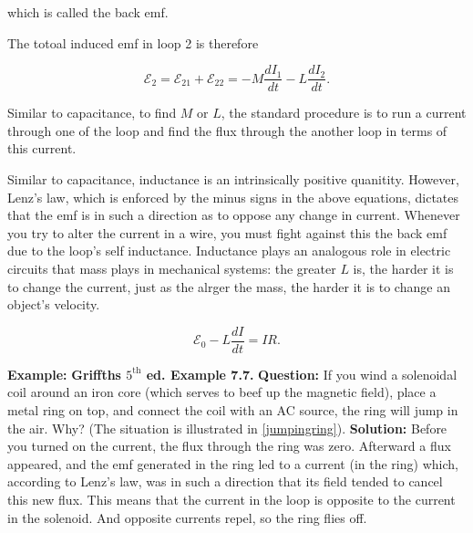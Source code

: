 \documentclass[english,a4paper,12pt]{report}
\begin{document}
which is called the back emf.

The totoal induced emf in loop 2 is therefore

\begin{equation}
    \mathcal{E}_{2}   = \mathcal{E} _{21} + \mathcal{E}_{22} =  -M\frac{dI_1 }{dt}  - L \frac{dI_2 }{dt}.
\end{equation}





Similar to capacitance, to find \(M \text { or } L\), the standard procedure is to run a current through one of the loop and find the flux through the another loop in terms of this current.  

Similar to capacitance, inductance is an intrinsically positive quanitity. However, Lenz's law, which is enforced by the minus signs in the above equations, dictates that the emf is in such a direction as to oppose any change in current. Whenever you try to alter the current in a wire, you must fight against this the back emf due to the loop's self inductance. Inductance plays an analogous role in electric circuits that mass plays in mechanical systems: the greater \(L\) is, the harder it is to change the current, just as the alrger the mass, the harder it is to change an object's velocity.

\begin{equation}
    \mathcal{E}_{0} - L\frac{dI}{dt} = IR.  
\end{equation}

\begin{example_template}
    \textbf{Example:} \textbf{Griffths \(5^\text{th}\) ed. Example 7.7.} \newline \newline
    \textbf{Question:} If you wind a solenoidal coil around an iron core (which serves to beef up the magnetic field), place a metal ring on top, and connect the coil with an AC source, the ring will jump in the air. Why? (The situation is illustrated in \cref{jumpingring}). \newline \newline
    \textbf{Solution:} Before you turned on the current, the flux through the ring was zero. Afterward a flux appeared, and the emf generated in the ring led to a current (in the ring) which, according to Lenz’s law, was in such a direction that its field tended to cancel this new flux. This means that the current in the loop is opposite to the current in the solenoid. And opposite currents repel, so the ring flies off.
\end{example_template}
\end{document}
